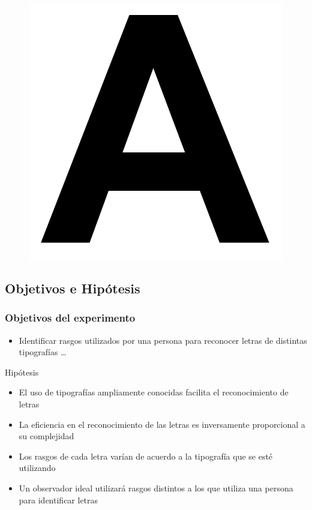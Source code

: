\documentclass{beamer}
\begin{document}
\begin{frame}
 \begin{figure}
  \includegraphics[scale=.2]{graficos/letra.png}
 \end{figure}
\end{frame}

\subsection{Objetivos e Hip\'otesis}
\begin{frame}
  \frametitle{Objetivos del experimento}
  \begin{itemize}
    \item Identificar rasgos utilizados por una persona para reconocer letras de distintas tipograf\'ias  \ldots \pause
\end{itemize}

\begin{block}{Hip\'otesis}
 \begin{itemize}
      \item El uso de tipograf\'ias ampliamente conocidas facilita el reconocimiento de letras \pause
      \item La eficiencia en el reconocimiento de las letras es inversamente proporcional a su complejidad \pause
      \item Los rasgos de cada letra var\'ian de acuerdo a la tipograf\'ia que se est\'e utilizando \pause
      \item Un observador ideal utilizar\'a rasgos distintos a los que utiliza una persona para identificar letras	
    \end{itemize}
\end{block}

\end{frame}
\end{document}
